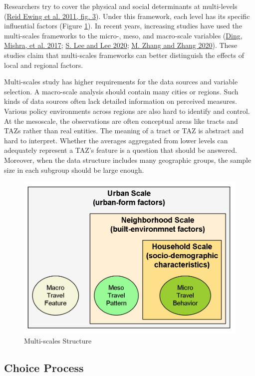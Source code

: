 \documentclass[
  12pt,
]{article}
\begin{document}
Researchers try to cover the physical and social determinants at multi-levels (\protect\hyperlink{ref-ewingTrafficGeneratedMixedUse2011}{Reid Ewing et al. 2011, fig. 3}). Under this framework, each level has its specific influential factors (Figure \ref{fig:Mscale}). In recent years, increasing studies have used the multi-scales frameworks to the micro-, meso, and macro-scale variables (\protect\hyperlink{ref-dingInfluencesBuiltEnvironment2017}{Ding, Mishra, et al. 2017}; \protect\hyperlink{ref-leeComparingImpactsLocal2020}{S. Lee and Lee 2020}; \protect\hyperlink{ref-zhangWhenContextMeets2020}{M. Zhang and Zhang 2020}). These studies claim that multi-scales frameworks can better distinguish the effects of local and regional factors.

Multi-scales study has higher requirements for the data sources and variable selection. A macro-scale analysis should contain many cities or regions. Such kinds of data sources often lack detailed information on perceived measures. Various policy environments across regions are also hard to identify and control. At the mesoscale, the observations are often conceptual areas like tracts and TAZs rather than real entities. The meaning of a tract or TAZ is abstract and hard to interpret. Whether the averages aggregated from lower levels can adequately represent a TAZ's feature is a question that should be answered. Moreover, when the data structure includes many geographic groups, the sample size in each subgroup should be large enough.

\begin{figure}

{\centering \includegraphics[width=0.5\linewidth]{fig/mscale} 

}

\caption{Multi-scales Structure}\label{fig:Mscale}
\end{figure}

\hypertarget{choice-process}{%
\subsection{Choice Process}\label{choice-process}}
\end{document}
